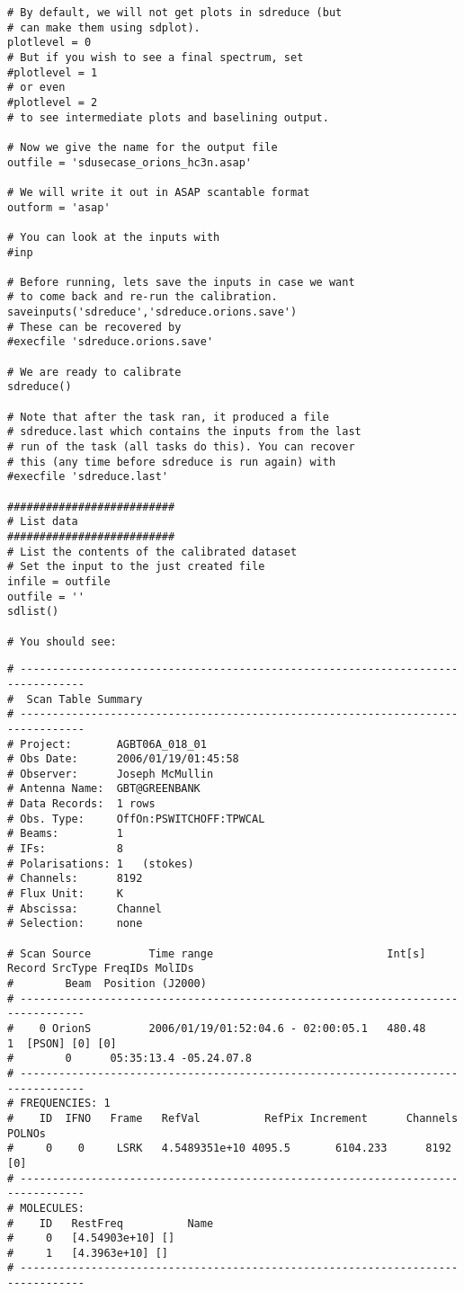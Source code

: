 \begin{verbatim}
# By default, we will not get plots in sdreduce (but
# can make them using sdplot).
plotlevel = 0
# But if you wish to see a final spectrum, set
#plotlevel = 1
# or even
#plotlevel = 2
# to see intermediate plots and baselining output.

# Now we give the name for the output file
outfile = 'sdusecase_orions_hc3n.asap'

# We will write it out in ASAP scantable format
outform = 'asap'

# You can look at the inputs with
#inp

# Before running, lets save the inputs in case we want
# to come back and re-run the calibration.
saveinputs('sdreduce','sdreduce.orions.save')
# These can be recovered by
#execfile 'sdreduce.orions.save'

# We are ready to calibrate
sdreduce()

# Note that after the task ran, it produced a file
# sdreduce.last which contains the inputs from the last
# run of the task (all tasks do this). You can recover
# this (any time before sdreduce is run again) with
#execfile 'sdreduce.last'

##########################
# List data
##########################
# List the contents of the calibrated dataset
# Set the input to the just created file
infile = outfile
outfile = ''
sdlist()

# You should see:
\end{verbatim}
\footnotesize
\begin{verbatim}
# --------------------------------------------------------------------------------
#  Scan Table Summary
# --------------------------------------------------------------------------------
# Project:       AGBT06A_018_01
# Obs Date:      2006/01/19/01:45:58
# Observer:      Joseph McMullin
# Antenna Name:  GBT@GREENBANK
# Data Records:  1 rows
# Obs. Type:     OffOn:PSWITCHOFF:TPWCAL
# Beams:         1   
# IFs:           8   
# Polarisations: 1   (stokes)
# Channels:      8192
# Flux Unit:     K
# Abscissa:      Channel
# Selection:     none

# Scan Source         Time range                           Int[s] Record SrcType FreqIDs MolIDs 
#        Beam  Position (J2000)       
# --------------------------------------------------------------------------------
#    0 OrionS         2006/01/19/01:52:04.6 - 02:00:05.1   480.48     1  [PSON] [0] [0]
#        0      05:35:13.4 -05.24.07.8
# --------------------------------------------------------------------------------
# FREQUENCIES: 1
#    ID  IFNO   Frame   RefVal          RefPix Increment      Channels POLNOs
#     0    0     LSRK   4.5489351e+10 4095.5       6104.233      8192  [0]
# --------------------------------------------------------------------------------
# MOLECULES: 
#    ID   RestFreq          Name           
#     0   [4.54903e+10] []
#     1   [4.3963e+10] []
# --------------------------------------------------------------------------------
\end{verbatim}
